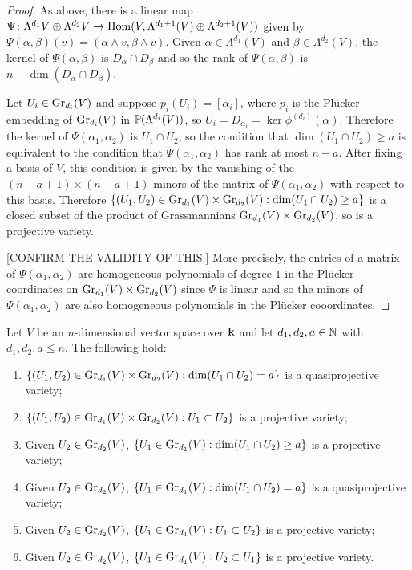 \documentclass[a4paper, 11pt]{report}
\begin{document}
\begin{proof}
As above, there is a linear map $\Psi\colon\Lambda^{d_1}{V}\oplus\Lambda^{d_2}{V}\to\HOM(V,\Lambda^{d_1+1}(V)\oplus\Lambda^{d_2+1}(V))$ given by $\Psi(\alpha,\beta)(v) = (\alpha\wedge v,\beta\wedge v)$. Given $\alpha\in\Lambda^{d_1}(V)$ and $\beta\in\Lambda^{d_2}(V)$, the kernel of $\Psi(\alpha,\beta)$ is $D_\alpha\cap D_\beta$ and so the rank of $\Psi(\alpha,\beta)$ is $n-\dim(D_\alpha\cap D_\beta)$.

Let $U_i\in\GR[d_i]{V}$ and suppose $p_i(U_i)=[\alpha_i]$, where $p_i$ is the Pl\"ucker embedding of $\GR[d_i]{V}$ in $\Proj{(\Lambda^{d_i}(V))}$, so $U_i = D_{\alpha_i} = \ker{\phi^{(d_i)}(\alpha)}$. Therefore the kernel of $\Psi(\alpha_1,\alpha_2)$ is $U_1\cap U_2$, so the condition that $\dim(U_1\cap U_2)\geq a$ is equivalent to the condition that $\Psi(\alpha_1,\alpha_2)$ has rank at most $n-a$. After fixing a basis of $V$, this condition is given by the vanishing of the $(n-a+1)\times(n-a+1)$ minors of the matrix of $\Psi(\alpha_1,\alpha_2)$ with respect to this basis. Therefore $\{(U_1,U_2)\in\GR[d_1]{V}\times\GR[d_2]{V}:\dim(U_1\cap U_2)\geq a\}$ is a closed subset of the product of Grassmannians $\GR[d_1]{V}\times\GR[d_2]{V}$, so is a projective variety.

{\color{gray}[CONFIRM THE VALIDITY OF THIS.] More precisely, the entries of a matrix of $\Psi(\alpha_1,\alpha_2)$ are homogeneous polynomials of degree $1$ in the Pl\"ucker coordinates on $\GR[d_1]{V}\times\GR[d_2]{V}$ since $\Psi$ is linear and so the minors of $\Psi(\alpha_1,\alpha_2)$ are also homogeneous polynomials in the Pl\"ucker cooordinates.}
\end{proof}

\begin{lemma}\label{lemma:grassmannian-incidence-lemmas}
Let $V$ be an $n$-dimensional vector space over $\field$ and let $d_1,d_2,a\in\naturals$ with $d_1,d_2,a\le n$. The following hold:
\begin{enumerate}
\item
$\{(U_1,U_2)\in\GR[d_1]{V}\times\GR[d_2]{V}: \dim(U_1\cap U_2) = a\}$ is a quasiprojective variety;
\item
$\{(U_1,U_2)\in\GR[d_1]{V}\times\GR[d_2]{V}: U_1\subset U_2\}$ is a projective variety;
\item
Given $U_2\in\GR[d_2]{V}$, $\{U_1\in\GR[d_1]{V}: \dim(U_1\cap U_2)\geq a\}$ is a projective variety;
\item
Given $U_2\in\GR[d_2]{V}$, $\{U_1\in\GR[d_1]{V}:\dim(U_1\cap U_2) = a\}$ is a quasiprojective variety;
\item
Given $U_2\in\GR[d_2]{V}$, $\{U_1\in\GR[d_1]{V}: U_1\subset U_2\}$ is a projective variety;
\item
Given $U_2\in\GR[d_2]{V}$, $\{U_1\in\GR[d_1]{V}: U_2\subset U_1\}$ is a projective variety.
\end{enumerate}
\end{lemma}
\end{document}
